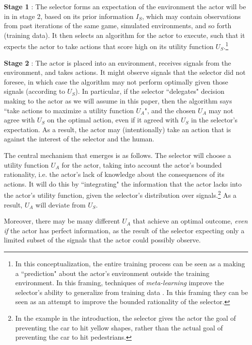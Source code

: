 \begin{description}
	\item \textbf{Stage 1} : The selector forms an expectation of the environment the actor will be in in stage 2, based on its prior information $I_S$, which may contain observations from past iterations of the same game, simulated environments, and so forth (training data). It then selects an algorithm for the actor to execute, such that it expects the actor to take actions that score high on its utility function $U_S$.\footnote{In this conceptualization, the entire training process can be seen as a making a ``prediction" about the actor's environment outside the training environment. In this framing, techniques of \textit{meta-learning} improve the selector's ability to generalize from training data \citep{Andrychowicz2018}. In this framing they can be seen as an attempt to improve the bounded rationality of the selector. }
	
	\item \textbf{Stage 2} : The actor is placed into an environment, receives signals from the environment, and takes actions. It might observe signals that the selector did not foresee, in which case the algorithm may not perform optimally given those signals (according to $U_S$). In particular, if the selector ``delegates" decision making to the actor as we will assume in this paper, then the algorithm says ``take actions to maximize a utility function $U_A$", and the chosen $U_A$ may not agree with $U_S$ on the optimal action, even if it agreed with $U_S$ in the selector's expectation. As a result, the actor may (intentionally) take an action that is against the interest of the selector and the human.
\end{description}


The central mechanism that emerges is as follows. The selector will choose a utility function $U_A$ for the actor, taking into account the actor's bounded rationality, i.e. the actor's lack of knowledge about the consequences of its actions. It will do this by ``integrating" the information that the actor lacks into the actor's utility function, given the selector's distribution over signals.\footnote{In the example in the introduction, the selector gives the actor the goal of preventing the car to hit yellow shapes, rather than the actual goal of preventing the car to hit pedestrians. } As a result, $U_A$ will deviate from $U_S$.
	
	Moreover, there may be many different $U_A$ that achieve an optimal outcome, \textit{even if} the actor has perfect information, as the result of the selector expecting only a limited subset of the signals that the actor could possibly observe. 





